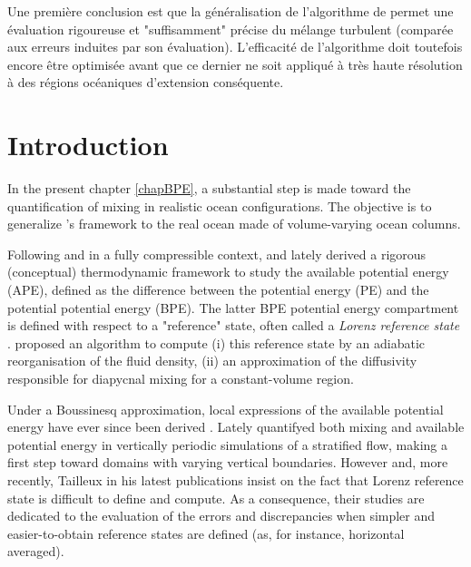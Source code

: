 Une première conclusion est que la généralisation de l'algorithme de \cite{winters_available_1995} permet une évaluation rigoureuse et "suffisamment" précise du mélange turbulent (comparée aux erreurs induites par son évaluation). L'efficacité de l'algorithme doit toutefois encore être optimisée avant que ce dernier ne soit appliqué à très haute résolution à des régions océaniques d'extension conséquente.

\section{Introduction}

In the present chapter \ref{chapBPE}, a substantial step is made toward the quantification of mixing in realistic ocean configurations. The objective is to generalize \citet{winters_available_1995}'s framework to the real ocean made of volume-varying ocean columns.

\color{blue} Following \cite{lorenz_available_1955} and in a fully compressible context, \cite{tailleux_energetics_2009} and lately \cite{tailleux_irreversible_2013} derived a rigorous (conceptual) thermodynamic framework to study the available potential energy (APE), defined as the difference between the potential energy (PE) and the potential potential energy (BPE). The latter BPE potential energy compartment is defined with respect to a "reference" state, often called a \textit{Lorenz reference state} \citep{saenz_estimating_2015}. \cite{winters_available_1995} proposed an algorithm to compute (i) this reference state by an adiabatic reorganisation of the fluid density, (ii) an approximation of the diffusivity responsible for diapycnal mixing for a constant-volume region.

Under a Boussinesq approximation, local expressions of the available potential energy have ever since been derived \citep{winters_available_2013}. Lately \cite{howland_mixing_2020,howland_quantifying_2020} quantifyed both mixing and available potential energy in vertically periodic simulations of a stratified flow, making a first step toward domains with varying vertical boundaries. However \cite{saenz_estimating_2015} and, more recently, Tailleux in his latest publications \citep{tailleux_local_2018} insist on the fact that Lorenz reference state is difficult to define and compute. As a consequence, their studies are dedicated to the evaluation of the errors and discrepancies when simpler and easier-to-obtain reference states are defined (as, for instance, horizontal averaged).\color{black}

